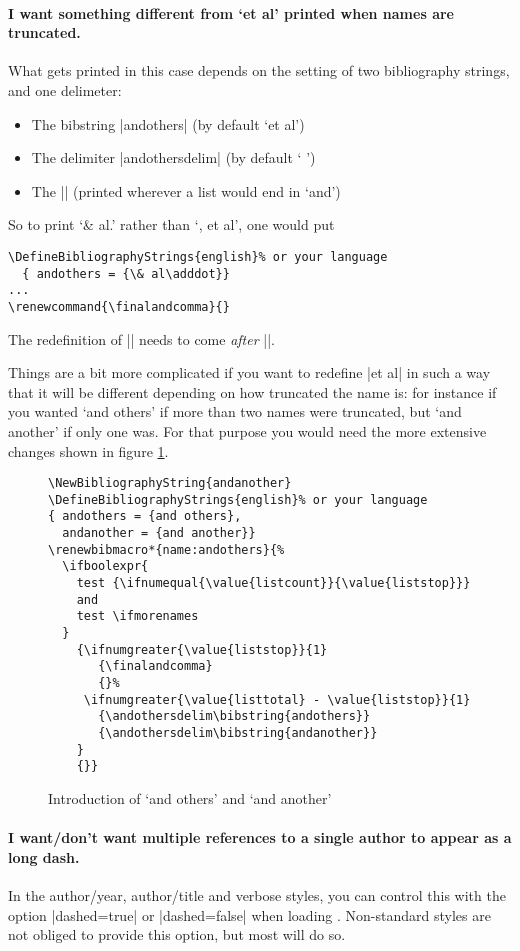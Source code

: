 \paragraph{I want something different from `et al' printed when names
  are truncated.} What gets printed in this case depends on the
setting of two bibliography strings, and one delimeter:
\begin{itemize}
\item The bibstring |andothers| (by default `et al')
\item The delimiter |andothersdelim| (by default ` ')
\item The |\finalandcomma| (printed wherever a list would end in
  `and')
\end{itemize}
So to print `\& al.' rather than `, et al', one would put
\begin{Verbatim}
\DefineBibliographyStrings{english}% or your language
  { andothers = {\& al\adddot}}
...
\renewcommand{\finalandcomma}{}
\end{Verbatim}
The redefinition of |\finalandcomma| needs to come \emph{after}
||.

Things are a bit more complicated if you want to redefine |et al| in
such a way that it will be different depending on how truncated the
name is: for instance if you wanted `and others' if more than two
names were truncated, but `and another' if only one was. For that
purpose you would need the more extensive changes shown in figure
\ref{andothers}.
\begin{figure}
\begin{Verbatim}[frame=single]
\NewBibliographyString{andanother}
\DefineBibliographyStrings{english}% or your language
{ andothers = {and others},
  andanother = {and another}}
\renewbibmacro*{name:andothers}{%
  \ifboolexpr{
    test {\ifnumequal{\value{listcount}}{\value{liststop}}}
    and
    test \ifmorenames
  }
    {\ifnumgreater{\value{liststop}}{1}
       {\finalandcomma}
       {}%
     \ifnumgreater{\value{listtotal} - \value{liststop}}{1}
       {\andothersdelim\bibstring{andothers}}
       {\andothersdelim\bibstring{andanother}}
    }
    {}}
\end{Verbatim}
\caption{Introduction of `and others' and `and another'\label{andothers}}
\end{figure}

\paragraph{I want/don't want multiple references to a single author to
  appear as a long dash.} In the author/year, author/title and verbose
styles, you can control this with the option |dashed=true| or
|dashed=false| when loading \biblatex. Non-standard styles are not
obliged to provide this option, but most will do so.

